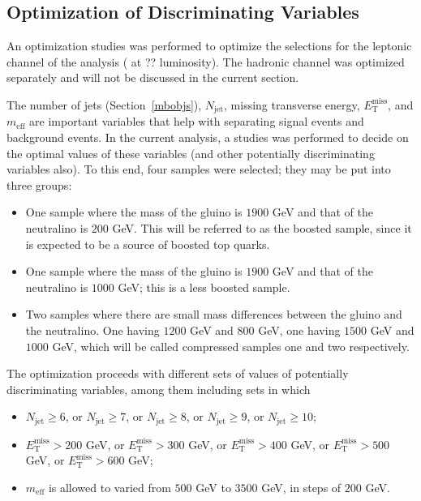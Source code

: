 \subsection{Optimization of Discriminating Variables}\label{mb:opt}

An optimization studies was performed to optimize the selections for the
leptonic channel of the analysis ({\color{pink} at ?? luminosity}). The
hadronic channel was optimized separately and will not be discussed in the
current section.

The number of jets (Section~\ref{mbobjs}), $N_{\text{jet}}$, missing transverse
energy, $E_{\text{T}}^{\text{miss}}$, and $m_{\text{eff}}$ are important
variables that help with separating signal events and background events. In the
current analysis, a studies was performed to decide on the optimal values of
these variables (and other potentially discriminating variables also). To this
end, four samples were selected; they may be put into three groups:

\begin{itemize}

	\item One sample where the mass of the gluino is $1900$ GeV and that of the
	      neutralino is $200$ GeV. This will be referred to as the boosted sample, since
	      it is expected to be a source of boosted top quarks.

	\item One sample where the mass of the gluino is $1900$ GeV and that of the
	      neutralino is $1000$ GeV; this is a less boosted sample.

	\item Two samples where there are small mass differences between the gluino and
	      the neutralino. One having $1200$ GeV and $800$ GeV, one having $1500$ GeV and
	      $1000$ GeV, which will be called compressed samples one and two respectively.

\end{itemize}

The optimization proceeds with different sets of values of potentially
discriminating variables, among them including sets in which

\begin{itemize}

	\item $N_{\text{jet}} \geq 6$, or $N_{\text{jet}} \geq 7$, or $N_{\text{jet}}
		      \geq 8$, or $N_{\text{jet}} \geq 9$, or $N_{\text{jet}} \geq 10$;

	\item $E_{\text{T}}^{\text{miss}} > 200$ GeV, or $E_{\text{T}}^{\text{miss}} >
		      300$ GeV, or $E_{\text{T}}^{\text{miss}} > 400$ GeV, or
	      $E_{\text{T}}^{\text{miss}} > 500$ GeV, or $E_{\text{T}}^{\text{miss}} > 600$
	      GeV;

	\item $m_{\text{eff}}$ is allowed to varied from $500$ GeV to $3500$ GeV, in
	      steps of $200$ GeV.

\end{itemize}

